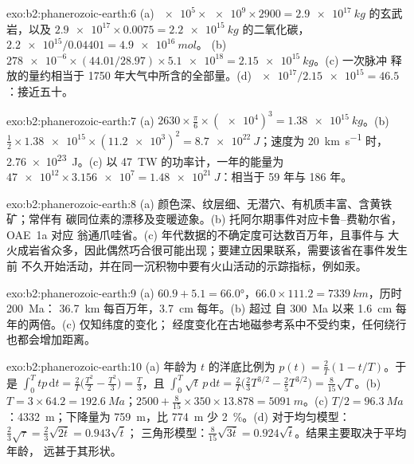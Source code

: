 \begin{solution}{exo:b2:phanerozoic-earth:6}
(a) $\num{e5} \times \num{e9} \times 2900 = \qty{2.9e17}{kg}$ 的玄武岩，以及 $\num{2.9e17}
\times 0.0075 = \qty{2.2e15}{kg}$ 的二氧化碳，$\num{2.2e15}/0.04401 = \qty{4.9e16}{mol}$。
(b) $\num{278e-6} \times (44.01/28.97) \times \num{5.1e18} = \qty{2.15e15}{kg}$。(c) 一次脉冲
释放的量约相当于 1750 年大气中所含的全部量。(d) $\num{e17}/\num{2.15e15} = 46.5$：接近五十。
\end{solution}

\begin{solution}{exo:b2:phanerozoic-earth:7}
(a) $2630 \times \frac{\pi}{6} \times (\num{e4})^3 = \qty{1.38e15}{kg}$。(b) $\tfrac12 \times
\num{1.38e15} \times (\num{11.2e3})^2 = \qty{8.7e22}{J}$；速度为 \qty{20}{km.s^{-1}} 时，
\qty{2.76e23}{J}。(c) 以 \qty{47}{TW} 的功率计，一年的能量为 $\num{47e12} \times \num{3.156e7} =
\qty{1.48e21}{J}$：相当于 59 年与 186 年。
\end{solution}

\begin{solution}{exo:b2:phanerozoic-earth:8}
(a) 颜色深、纹层细、无潜穴、有机质丰富、含黄铁矿；常伴有
碳同位素的漂移及变暖迹象。(b) 托阿尔期事件对应卡鲁–费勒尔省，OAE~1a 对应
翁通爪哇省。(c) 年代数据的不确定度可达数百万年，且事件与
大火成岩省众多，因此偶然巧合很可能出现；要建立因果联系，需要该省在事件发生前
不久开始活动，并在同一沉积物中要有火山活动的示踪指标，例如汞。
\end{solution}

\begin{solution}{exo:b2:phanerozoic-earth:9}
(a) $60.9 + 5.1 = \ang{66.0}$，$66.0 \times 111.2 = \qty{7339}{km}$，历时 \qty{200}{Ma}：
\qty{36.7}{km} 每百万年，\qty{3.7}{cm} 每年。(b) 超过
自 \qty{300}{Ma} 以来 \qty{1.6}{cm} 每年的两倍。(c) 仅知纬度的变化；
经度变化在古地磁参考系中不受约束，任何绕行也都会增加距离。
\end{solution}

\begin{solution}{exo:b2:phanerozoic-earth:10}
(a) 年龄为 $t$ 的洋底比例为 $p(t) = \frac2T(1 - t/T)$。于是 $\int_0^T tp\,\mathrm{d}t =
\frac2T\bigl(\frac{T^2}2 - \frac{T^2}3\bigr) = \frac T3$，且 $\int_0^T \sqrt t\,p\,\mathrm{d}t =
\frac2T\bigl(\frac23 T^{3/2} - \frac25 T^{3/2}\bigr) = \frac8{15}\sqrt T$。(b) $T = 3 \times 64.2 =
\qty{192.6}{Ma}$；$2500 + \frac8{15} \times 350 \times 13.878 = \qty{5091}{m}$。(c) $T/2 =
\qty{96.3}{Ma}$：\qty{4332}{m}；下降量为 \qty{759}{m}，比
\qty{774}{m} 少 \qty{2}{\percent}。(d) 对于均匀模型：$\frac23\sqrt\tau = \frac23\sqrt{2\bar t} = 0.943\sqrt{\bar t}$；
三角形模型：$\frac8{15}\sqrt{3\bar t} = 0.924\sqrt{\bar t}$。结果主要取决于平均年龄，
远甚于其形状。
\end{solution}

